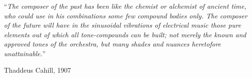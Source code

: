 \cleardoublepage

\vspace*{0.2\textheight}

\noindent\enquote{\itshape The composer of the past has been like the chemist or alchemist of ancient time, who could use in his combinations some few compound bodies only. The composer of the future will have in the sinusoidal vibrations of electrical music those pure elements out of which all tone-compounds can be built; not merely the known and approved tones of the orchestra, but many shades and nuances heretofore unattainable.}\bigbreak

\hfill Thaddeus Cahill, 1907